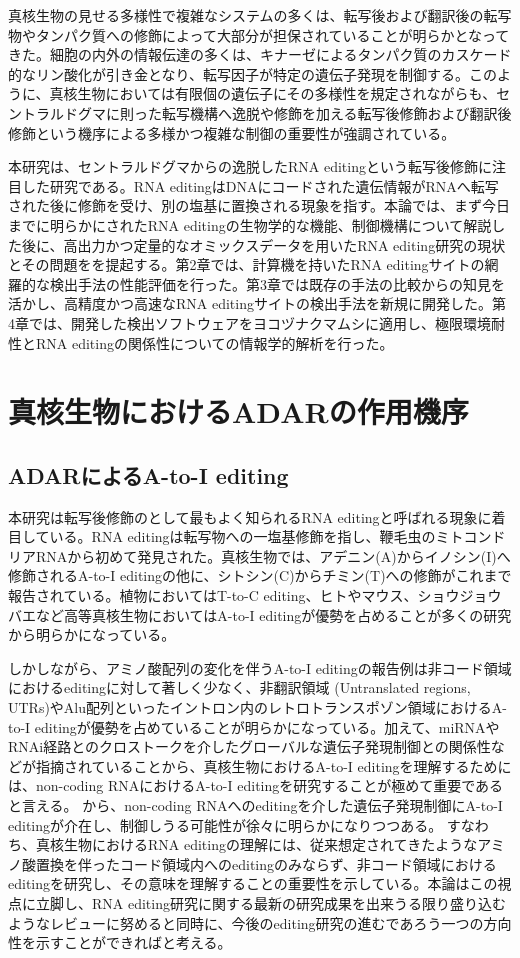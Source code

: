 真核生物の見せる多様性で複雑なシステムの多くは、転写後および翻訳後の転写物やタンパク質への修飾によって大部分が担保されていることが明らかとなってきた。細胞の内外の情報伝達の多くは、キナーゼによるタンパク質のカスケード的なリン酸化が引き金となり、転写因子が特定の遺伝子発現を制御する。このように、真核生物においては有限個の遺伝子にその多様性を規定されながらも、セントラルドグマに則った転写機構へ逸脱や修飾を加える転写後修飾および翻訳後修飾という機序による多様かつ複雑な制御の重要性が強調されている。
\par
本研究は、セントラルドグマからの逸脱したRNA editingという転写後修飾に注目した研究である。RNA editingはDNAにコードされた遺伝情報がRNAへ転写された後に修飾を受け、別の塩基に置換される現象を指す。本論では、まず今日までに明らかにされたRNA editingの生物学的な機能、制御機構について解説した後に、高出力かつ定量的なオミックスデータを用いたRNA editing研究の現状とその問題をを提起する。第2章では、計算機を持いたRNA editingサイトの網羅的な検出手法の性能評価を行った。第3章では既存の手法の比較からの知見を活かし、高精度かつ高速なRNA editingサイトの検出手法を新規に開発した。第4章では、開発した検出ソフトウェアをヨコヅナクマムシに適用し、極限環境耐性とRNA editingの関係性についての情報学的解析を行った。

\section{真核生物におけるADARの作用機序}
\subsection{ADARによるA-to-I editing}
\par
本研究は転写後修飾のとして最もよく知られるRNA editingと呼ばれる現象に着目している。RNA editingは転写物への一塩基修飾を指し、鞭毛虫のミトコンドリアRNAから初めて発見された。真核生物では、アデニン(A)からイノシン(I)へ修飾されるA-to-I editingの他に、シトシン(C)からチミン(T)への修飾がこれまで報告されている。植物においてはT-to-C editing、ヒトやマウス、ショウジョウバエなど高等真核生物においてはA-to-I editingが優勢を占めることが多くの研究から明らかになっている。
\par
しかしながら、アミノ酸配列の変化を伴うA-to-I editingの報告例は非コード領域におけるeditingに対して著しく少なく、非翻訳領域 (Untranslated regions, UTRs)やAlu配列といったイントロン内のレトロトランスポゾン領域におけるA-to-I editingが優勢を占めていることが明らかになっている。加えて、miRNAやRNAi経路とのクロストークを介したグローバルな遺伝子発現制御との関係性などが指摘されていることから、真核生物におけるA-to-I editingを理解するためには、non-coding RNAにおけるA-to-I editingを研究することが極めて重要であると言える。
から、non-coding RNAへのeditingを介した遺伝子発現制御にA-to-I editingが介在し、制御しうる可能性が徐々に明らかになりつつある。
すなわち、真核生物におけるRNA editingの理解には、従来想定されてきたようなアミノ酸置換を伴ったコード領域内へのeditingのみならず、非コード領域におけるeditingを研究し、その意味を理解することの重要性を示している。本論はこの視点に立脚し、RNA editing研究に関する最新の研究成果を出来うる限り盛り込むようなレビューに努めると同時に、今後のediting研究の進むであろう一つの方向性を示すことができればと考える。

